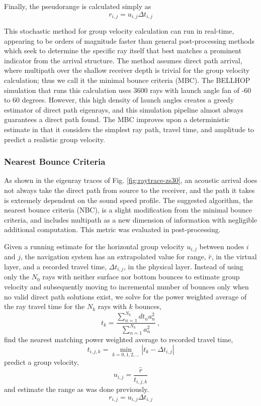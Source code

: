 Finally, the pseudorange is calculated simply as
\begin{equation}
r_{i,j} = u_{i,j} \Delta t_{i,j} 
\end{equation}

This stochastic method for group velocity calculation can run in real-time, appearing to be orders of magnitude faster than general post-processing methods which seek to determine the specific ray itself that best matches a prominent indicator from the arrival structure.
The method assumes direct path arrival, where multipath over the shallow receiver depth is trivial for the group velocity calculation; thus we call it the minimal bounce criteria (MBC).
The BELLHOP simulation that runs this calculation uses 3600 rays with launch angle fan of -60 to 60 degrees.
However, this high density of launch angles creates a greedy estimator of direct path eigenrays, and this simulation pipeline almost always guarantees a direct path found.
The MBC improves upon a deterministic estimate in that it considers the simplest ray path, travel time, and amplitude to predict a realistic group velocity.

\subsubsection{Nearest Bounce Criteria}

 As shown in the eigenray traces of Fig. \ref{fig:raytrace-zs30}, an acoustic arrival does not always take the direct path from source to the receiver, and the path it takes is extremely dependent on the sound speed profile.
The suggested algorithm, the nearest bounce criteria (NBC), is a slight modification from the minimal bounce criteria, and includes multipath as a new dimension of information with negligible additional computation.
This metric was evaluated in post-processing.

Given a running estimate for the horizontal group velocity $u_{i,j}$ between nodes $i$ and $j$, the navigation system has an extrapolated value for range, $\hat{r}$, in the virtual layer, and a recorded travel time, $\Delta t_{i,j}$, in the physical layer.
Instead of using only the $N_0$ rays with neither surface nor bottom bounces to estimate group velocity and subsequently moving to incremental number of bounces only when no valid direct path solutions exist, we solve for the power weighted average of the ray travel time for the $N_k$ rays with $k$ bounces,
\begin{equation}
t_k = \frac{\sum_{n=1}^{N_{k}} dt_{n}a_{n}^{2}}{\sum_{n=1}^{N_{k}} a_{n}^{2}} ~, 
\end{equation}
find the nearest matching power weighted average to recorded travel time,
\begin{equation}
t_{i,j,k} = \min_{k=0,1,2,...} \left| t_k - \Delta t_{i,j} \right|
\end{equation}
predict a group velocity,
\begin{equation}
u_{i,j} = \dfrac{\hat{r}}{t_{i,j,k}}
\end{equation}
and estimate the range as was done previously.
\begin{equation}
r_{i,j} = u_{i,j}\Delta t_{i,j}
\end{equation}

